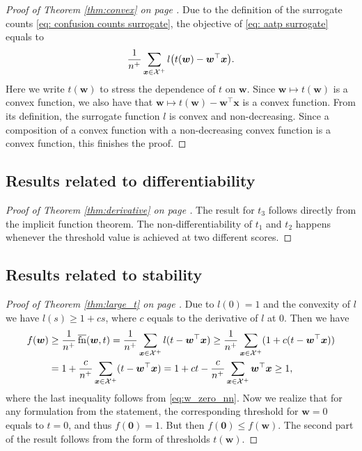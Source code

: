 \thmconvex*
\begin{proof}[Proof of Theorem \ref{thm:convex} on page \pageref{thm:convex}]
  Due to the definition of the surrogate counts \eqref{eq: confusion counts surrogate}, the objective of \eqref{eq: aatp surrogate} equals to
  \begin{equation*}
    \frac{1}{n^+}\sum_{\bm{x} \in \Xc^+} l\Brac{t(\bm{w})-\bm{w}^\top \bm{x}}.
  \end{equation*}
  Here we write $t(\bm{w})$ to stress the dependence of $t$ on $\bm{w}$. Since $\bm{w}\mapsto t(\bm{w})$ is a convex function, we also have that $\bm{w}\mapsto t(\bm{w})-\bm{w}^\top \bm{x}$ is a convex function. From its definition, the surrogate function $l$ is convex and non-decreasing. Since a composition of a convex function with a non-decreasing convex function is a convex function, this finishes the proof.
\end{proof}

\subsection{Results related to differentiability}

\derivative*
\begin{proof}[Proof of Theorem \ref{thm:derivative} on page \pageref{thm:derivative}]
  The result for $t_3$ follows directly from the implicit function theorem. The non-differentiability of $t_1$ and $t_2$ happens whenever the threshold value is achieved at two different scores.
\end{proof}

\subsection{Results related to stability}

\larget*
\begin{proof}[Proof of Theorem \ref{thm:large_t} on page \pageref{thm:large_t}]
  Due to $l(0)=1$ and the convexity of $l$ we have $l(s)\ge 1+cs$, where $c$ equals to the derivative of $l$ at $0$. Then we have
  \begin{equation*}
    \begin{aligned}
      f(\bm{w}) 
      & \ge \frac{1}{n^+}\operatorname{\overline{fn}}(\bm{w}, t) = \frac{1}{n^+}\sum_{\bm{x} \in \mathcal{X}^+}l(t-\bm{w}^\top \bm{x}) \ge \frac{1}{n^+}\sum_{\bm{x} \in \mathcal{X}^+}(1+c(t-\bm{w}^\top \bm{x})) \\
      & = 1+\frac{c}{n^+}\sum_{\bm{x} \in \mathcal{X}^+}(t-\bm{w}^\top \bm{x}) = 1+ct - \frac{c}{n^+}\sum_{\bm{x} \in \mathcal{X}^+}\bm{w}^\top \bm{x} \ge 1,
    \end{aligned}
  \end{equation*}
  where the last inequality follows from \eqref{eq:w_zero_nn}. Now we realize that for any formulation from the statement, the corresponding threshold for $\bm{w}=0$ equals to $t=0$, and thus $f(\bm{0})=1$. But then $f(\bm{0})\le f(\bm{w})$. The second part of the result follows from the form of thresholds $t(\bm{w})$.
\end{proof}

